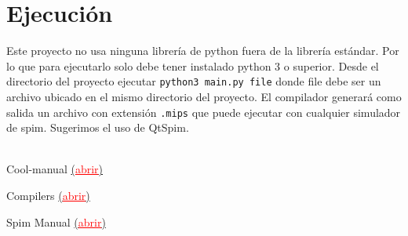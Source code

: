 \documentclass[twoside]{article}
\begin{document}
\section{Ejecuci\'on}
Este proyecto no usa ninguna librer\'ia de python fuera de la librer\'ia est\'andar. Por lo que para ejecutarlo solo debe tener instalado python 3 o superior. Desde el directorio del proyecto ejecutar \texttt{python3 main.py file} donde file debe ser un archivo ubicado en el mismo directorio del proyecto. El compilador generar\'a como salida un archivo con extensi\'on \texttt{.mips} que puede ejecutar con cualquier simulador de spim. Sugerimos el uso de QtSpim.\\\\


\begin{thebibliography}{99}
	 Cool-manual \href{https://github.com/BeginnerCompilers/cool-compiler-2021/tree/master/doc/Report/files/cool-manual.pdf}{(\textcolor{red}{\underline{abrir}})}
	
	 Compilers \href{https://github.com/BeginnerCompilers/cool-compiler-2021/tree/master/doc/Report/files/compilers.pdf}{(\textcolor{red}{\underline{abrir}})}
	
	 Spim Manual \href{https://github.com/BeginnerCompilers/cool-compiler-2021/tree/master/doc/Report/files/SPIM\_Manual.pdf}{(\textcolor{red}{\underline{abrir}})}
\end{thebibliography}
\end{document}
